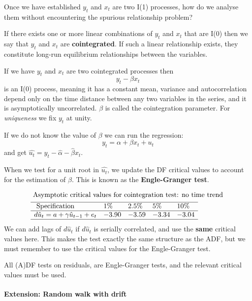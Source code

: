 \documentclass[11pt]{article}
\begin{document}
Once we have established $y_t$ and $x_t$ are two I(1) processes, how do we analyse them without encountering the spurious relationship problem?

If there exists one or more linear combinations of $y_t$ and $x_t$ that are I(0) then we say that $y_t$ and $x_t$ are \textbf{cointegrated}. If such a linear relationship exists, they constitute long-run equilibrium relationships between the variables.

If we have $y_t$ and $x_t$ are two cointegrated processes then 
\[y_t - \beta x_t\]
is an I(0) process, meaning it has a constant mean, variance and autocorrelation depend only on the time distance between any two variables in the series, and it is asymptotically uncorrelated. $\beta$ is called the cointegration parameter. For \textit{uniqueness} we fix $y_t$ at unity.

If we do not know the value of $\beta$ we can run the regression:
\[y_t = \alpha + \beta x_t + u_t\]
and get $\hat{u_t}= y_t - \hat{\alpha} -\hat{\beta}x_t$.

When we test for a unit root in $\hat{u_t}$, we update the DF critical values to account for the estimation of $\beta$. This is known as the \textbf{Engle-Granger test}.

\begin{equation}
\begin{aligned}
&\text { Asymptotic critical values for cointegration test: no time trend }\\
&\begin{array}{lllll}
\hline \text { Specification } & 1 \% & 2.5 \% & 5 \% & 10 \% \\
\hline d \hat{u}_t=a+\gamma \hat{u}_{t-1}+e_t & -3.90 & -3.59 & -3.34 & -3.04 \\
\hline
\end{array}
\end{aligned}
\end{equation}
We can add lags of $d\hat{u}_t$ if $d\hat{u}_t$ is serially correlated, and use the \textbf{same} critical values here. This makes the test exactly the same structure as the ADF, but we must remember to use the critical values for the Engle-Granger test.

\begin{note}
    All (A)DF tests on residuals, are Engle-Granger tests, and the relevant critical values must be used.
\end{note}

\paragraph{Extension: Random walk with drift} \mbox{}
\end{document}
